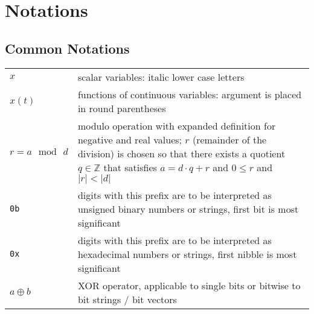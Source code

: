 \chapter*{Notations \label{chap:Notations}}


\section*{Common Notations}
\setlength\extrarowheight{0.5em}
\begin{flushleft}
\begin{longtable}{>{\raggedright}p{} >{\raggedright}p{}}
$x$ & scalar variables: italic lower case letters \tabularnewline
$x\left(t\right)$ & functions of continuous variables: argument is placed in round parentheses \tabularnewline 
$r = a \, \bmod \, d$ & modulo operation with expanded definition for negative and real values; $r$ (remainder of the division) is chosen so that there exists a quotient $q \in \mathbb{Z}$ that satisfies $a = d \cdot q + r$ and $0 \leq r$ and $|r| < |d|$ \tabularnewline
\texttt{0b} & digits with this prefix are to be interpreted as unsigned binary numbers or strings, first bit is most significant \tabularnewline
\texttt{0x} & digits with this prefix are to be interpreted as hexadecimal numbers or strings, first nibble is most significant \tabularnewline
$a \oplus b$ & XOR operator, applicable to single bits or bitwise to bit strings / bit vectors \tabularnewline
\end{longtable}
\end{flushleft}
\setlength\extrarowheight{0em}

